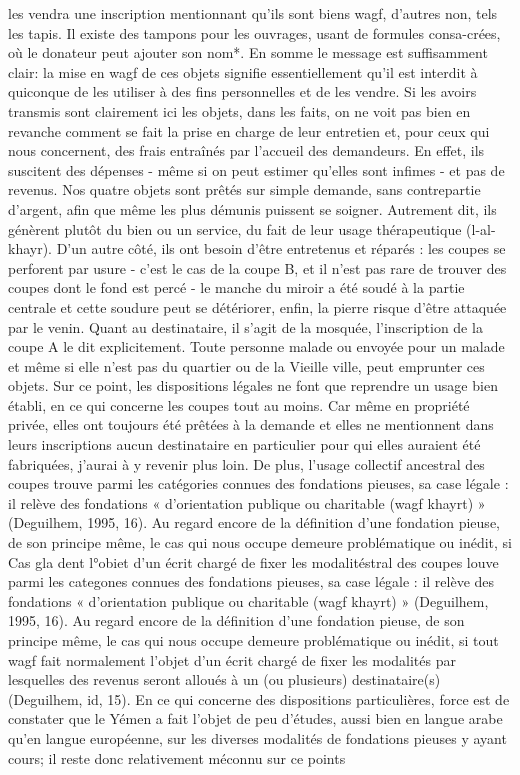les vendra
une inscription mentionnant qu'ils sont biens wagf, d'autres non, tels les tapis. Il existe des tampons pour les ouvrages, usant de formules consa-crées, où le donateur peut ajouter son nom*. En somme le message est suffisamment clair: la mise en wagf de ces objets signifie essentiellement qu'il est interdit à quiconque de les utiliser à des fins personnelles et de les vendre.
Si les avoirs transmis sont clairement ici les objets, dans les faits, on ne voit pas bien en revanche comment se fait la prise en charge de leur entretien et, pour ceux qui nous concernent, des frais entraînés par l'accueil des demandeurs. En effet, ils suscitent des dépenses - même si on peut estimer qu'elles sont infimes - et pas de revenus. Nos quatre
objets sont prêtés sur simple demande, sans contrepartie d'argent, afin que même les plus démunis puissent se soigner. Autrement dit, ils génèrent plutôt du bien ou un service, du fait de leur usage thérapeutique (l-al-khayr). D'un autre côté, ils ont besoin d'être entretenus et réparés : les coupes se perforent par usure - c'est le cas de la coupe B, et il n'est pas rare de trouver des coupes dont le fond est percé - le manche du miroir a été soudé à la partie centrale et cette soudure peut se détériorer, enfin, la pierre risque d'être attaquée par le venin. Quant au destinataire, il s'agit de la mosquée, l'inscription de la coupe A le dit explicitement. Toute personne malade ou envoyée pour un malade et même si elle n'est pas du quartier ou de la Vieille ville, peut emprunter ces objets. Sur ce point, les dispositions légales ne font que reprendre un usage bien établi, en ce qui concerne les coupes tout au moins. Car même en propriété privée, elles ont toujours été prêtées à la demande et elles ne mentionnent dans leurs inscriptions aucun destinataire en particulier pour qui elles auraient été fabriquées, j'aurai à y revenir plus loin. De plus, l'usage collectif ancestral des coupes trouve parmi les catégories connues des fondations pieuses, sa case légale : il relève des fondations « d'orientation publique
ou charitable (wagf khayrt) » (Deguilhem, 1995, 16).
Au regard encore de la définition d'une fondation pieuse, de son principe même, le cas qui nous occupe demeure problématique ou inédit, si
Cas gla dent l°obiet d'un écrit chargé de fixer les modalitéstral des coupes louve parmi les categones connues des fondations pieuses, sa case légale : il relève des fondations « d'orientation publique
ou charitable (wagf khayrt) » (Deguilhem, 1995, 16).
Au regard encore de la définition d'une fondation pieuse, de son principe même, le cas qui nous occupe demeure problématique ou inédit, si tout wagf fait normalement l'objet d'un écrit chargé de fixer les modalités par lesquelles des revenus seront alloués à un (ou plusieurs) destinataire(s) (Deguilhem, id, 15). En ce qui concerne des dispositions particulières, force est de constater que le Yémen a fait l'objet de peu d'études, aussi bien en langue arabe qu'en langue européenne, sur les diverses modalités de fondations pieuses y ayant cours; il reste donc relativement méconnu sur ce points

